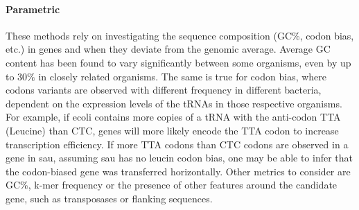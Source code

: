 \documentclass[12pt,letter]{article}
\begin{document}
\paragraph{Parametric}
These methods rely on investigating the sequence composition (GC\%, codon bias, etc.) in genes and when they deviate from the genomic average.
Average GC content has been found to vary significantly between some organisms, even by up to $30\%$ in closely related organisms\citep{ihgt}.
The same is true for codon bias, where codons variants are observed with different frequency in different bacteria, dependent on the expression levels of the tRNAs in those respective organisms\citep{ihgt,codonbias}.
For example, if \ac{ecoli} contains more copies of a tRNA with the anti-codon TTA (Leucine) than CTC, genes will more likely encode the TTA codon to increase transcription efficiency\citep{codonbias}.
If more TTA codons than CTC codons are observed in a gene in \ac{sau}, assuming \ac{sau} has no leucin codon bias, one may be able to infer that the codon-biased gene was transferred horizontally\citep{ihgt}.
Other metrics to consider are GC\%, k-mer frequency or the presence of other features around the candidate gene, such as transposases or flanking sequences\citep{ihgt}.
\end{document}
